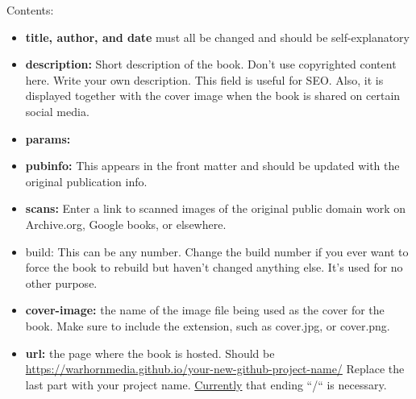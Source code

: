 \documentclass[
  english,
]{book}
\providecommand{\tightlist}{%
  \setlength{\itemsep}{0pt}\setlength{\parskip}{0pt}}
\begin{document}
\begin{description}
Contents:

\begin{itemize}
\tightlist
\item
  \textbf{title, author, and date} must all be changed and should be self-explanatory
\end{itemize}

\begin{itemize}
\tightlist
\item
  \textbf{description:} Short description of the book. Don't use copyrighted content here. Write your own description. This field is useful for SEO. Also, it is displayed together with the cover image when the book is shared on certain social media.
\end{itemize}

\begin{itemize}
\tightlist
\item
  \textbf{params:}
\end{itemize}

\begin{itemize}
\tightlist
\item
  \textbf{pubinfo:} This appears in the front matter and should be updated with the original publication info.
\end{itemize}

\begin{itemize}
\tightlist
\item
  \textbf{scans:} Enter a link to scanned images of the original public domain work on Archive.org, Google books, or elsewhere.
\end{itemize}

\begin{itemize}
\tightlist
\item
  build: This can be any number. Change the build number if you ever want to force the book to rebuild but haven't changed anything else. It's used for no other purpose.
\end{itemize}

\begin{itemize}
\tightlist
\item
  \textbf{cover-image:} the name of the image file being used as the cover for the book. Make sure to include the extension, such as cover.jpg, or cover.png.
\end{itemize}

\begin{itemize}
\tightlist
\item
  \textbf{url:} the page where the book is hosted. Should be \url{https://warhornmedia.github.io/your-new-github-project-name/} Replace the last part with your project name. \href{https://github.com/rstudio/bookdown/issues/963}{Currently} that ending ``/`` is necessary.
\end{itemize}


\end{description}
\end{document}

